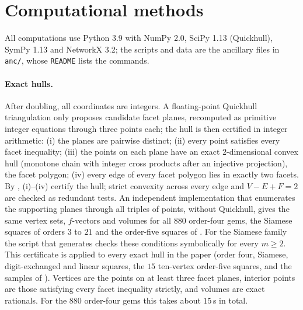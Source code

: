 \section{Computational methods}
\label{sec:appendix}

All computations use Python 3.9 with NumPy 2.0, SciPy 1.13 (Quickhull), SymPy 1.13 and NetworkX 3.2; the scripts and data are the ancillary files in \texttt{anc/}, whose \texttt{README} lists the commands.

\paragraph{Exact hulls.}
After doubling, all coordinates are integers.
A floating-point Quickhull triangulation only proposes candidate facet planes, recomputed as primitive integer equations through three points each; the hull is then certified in integer arithmetic:
(i) the planes are pairwise distinct;
(ii) every point satisfies every facet inequality;
(iii) the points on each plane have an exact $2$-dimensional convex hull (monotone chain with integer cross products after an injective projection), the facet polygon;
(iv) every edge of every facet polygon lies in exactly two facets.
By , (i)--(iv) certify the hull; strict convexity across every edge and $V-E+F=2$ are checked as redundant tests.
An independent implementation that enumerates the supporting planes through all triples of points, without Quickhull, gives the same vertex sets, $f$-vectors and volumes for all $880$ order-four gems, the Siamese squares of orders $3$ to $21$ and the order-five squares of . For the Siamese family the script that generates  checks these conditions symbolically for every $m\ge2$.
This certificate is applied to every exact hull in the paper (order four, Siamese, digit-exchanged and linear squares, the $15$ ten-vertex order-five squares, and the samples of ).
Vertices are the points on at least three facet planes, interior points are those satisfying every facet inequality strictly, and volumes are exact rationals.
For the $880$ order-four gems this takes about $15$\,s in total.

